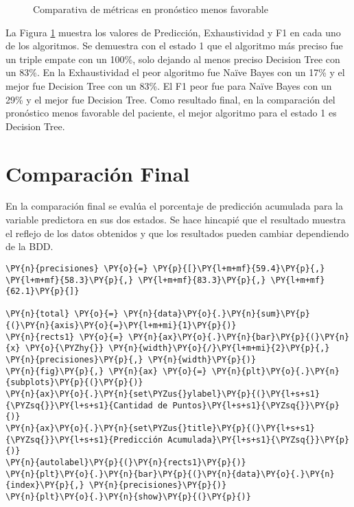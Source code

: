\begin{center}
    	\begin{figure}[H]
	\centering
	\caption{Comparativa de métricas en pronóstico menos favorable}
	\label{fig:cmpmf}
	\end{figure}
\end{center}
    
   La Figura \ref{fig:cmpmf} muestra los valores de Predicción, Exhaustividad y F1 en cada uno de los algoritmos. Se demuestra con el estado 1 que el algoritmo más preciso fue un triple empate con un 100\%, solo dejando al menos preciso Decision Tree con un 83\%. En la Exhaustividad el peor algoritmo fue Naïve Bayes con un 17\% y el mejor fue Decision Tree con un 83\%. El F1 peor fue para Naïve Bayes con un 29\% y el mejor fue Decision Tree.
    Como resultado final, en la comparación del pronóstico menos favorable del paciente, el mejor algoritmo para el estado 1 es Decision Tree.

    \hypertarget{comparaciuxf3n-final}{%
\section{Comparación Final}\label{comparaciuxf3n-final}}

	En la comparación final se evalúa el porcentaje de predicción acumulada para la variable predictora en sus dos estados. Se hace hincapié que el resultado muestra el reflejo de los datos obtenidos y que los resultados pueden cambiar dependiendo de la BDD.

    \begin{tcolorbox}[breakable, size=fbox, boxrule=1pt, pad at break*=1mm,colback=cellbackground, colframe=cellborder]
\begin{Verbatim}[commandchars=\\\{\}]
\PY{n}{precisiones} \PY{o}{=} \PY{p}{[}\PY{l+m+mf}{59.4}\PY{p}{,} \PY{l+m+mf}{58.3}\PY{p}{,} \PY{l+m+mf}{83.3}\PY{p}{,} \PY{l+m+mf}{62.1}\PY{p}{]}

\PY{n}{total} \PY{o}{=} \PY{n}{data}\PY{o}{.}\PY{n}{sum}\PY{p}{(}\PY{n}{axis}\PY{o}{=}\PY{l+m+mi}{1}\PY{p}{)}
\PY{n}{rects1} \PY{o}{=} \PY{n}{ax}\PY{o}{.}\PY{n}{bar}\PY{p}{(}\PY{n}{x} \PY{o}{\PYZhy{}} \PY{n}{width}\PY{o}{/}\PY{l+m+mi}{2}\PY{p}{,} \PY{n}{precisiones}\PY{p}{,} \PY{n}{width}\PY{p}{)}
\PY{n}{fig}\PY{p}{,} \PY{n}{ax} \PY{o}{=} \PY{n}{plt}\PY{o}{.}\PY{n}{subplots}\PY{p}{(}\PY{p}{)}
\PY{n}{ax}\PY{o}{.}\PY{n}{set\PYZus{}ylabel}\PY{p}{(}\PY{l+s+s1}{\PYZsq{}}\PY{l+s+s1}{Cantidad de Puntos}\PY{l+s+s1}{\PYZsq{}}\PY{p}{)}
\PY{n}{ax}\PY{o}{.}\PY{n}{set\PYZus{}title}\PY{p}{(}\PY{l+s+s1}{\PYZsq{}}\PY{l+s+s1}{Predicción Acumulada}\PY{l+s+s1}{\PYZsq{}}\PY{p}{)}
\PY{n}{autolabel}\PY{p}{(}\PY{n}{rects1}\PY{p}{)}
\PY{n}{plt}\PY{o}{.}\PY{n}{bar}\PY{p}{(}\PY{n}{data}\PY{o}{.}\PY{n}{index}\PY{p}{,} \PY{n}{precisiones}\PY{p}{)}
\PY{n}{plt}\PY{o}{.}\PY{n}{show}\PY{p}{(}\PY{p}{)}
\end{Verbatim}
\end{tcolorbox}

